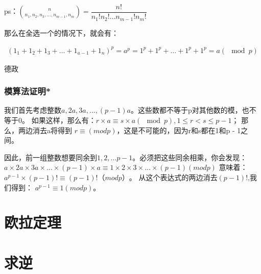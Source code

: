 \documentclass[12pt]{article}
\begin{document}
ps：$\binom{n}{n_{1},n_{2},n_{3},\dots,n_{m-1},n_{m}}=\dfrac{n!}{n_{1}!n_{2}!\dots n_{m-1}!n_{m}!}$

那么在全选一个的情况下，就会有：

\begin{align*}
    (1_{1}+1_{2}+1_{3}+\dots+1_{a-1}+1_{n})^{p}=a^{p}=1^{p}+1^{p}+\dots+1^{p}+1^{p}=a(\mod p)
\end{align*}

德政

\subsubsection{模算法证明*}

我们首先考虑整数$a,2a,3a,\dots ,(p - 1)a$。这些数都不等于p对其他数的模，也不等于0。
如果这样，那么有：$r × a \equiv s × a (\mod p),1 \leq r < s \leq p - 1$；
那么，两边消去a将得到 $r\equiv (mod p)$，这是不可能的，因为r和s都在1和p - 1之间。

因此，前一组整数想要同余到$1,2,\dots p - 1$。必须把这些同余相乘，你会发现：
$a × 2a × 3a × ... × (p - 1) × a \equiv 1 × 2 × 3 × ... × (p - 1)(mod p)$
意味着：
$a^{p-1} × (p - 1)! \equiv (p - 1)!（mod p）$。
从这个表达式的两边消去$(p - 1)!$,我们得到：
$a^{p-1} \equiv 1 (mod p)$。


\section{欧拉定理}




\section{求逆}
\end{document}
